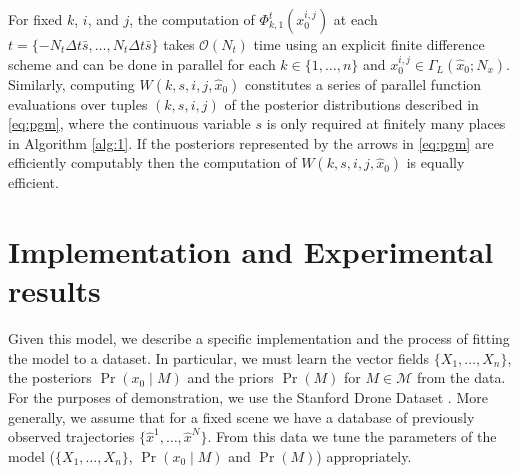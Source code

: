 \documentclass[letterpaper,10pt,conference]{ieeeconf}
\newtheorem{thm}{Theorem}
\begin{document}
For fixed $k$, $i$, and $j$, the computation of $\Phi_{k,1}^t(x_0^{i,j})$ at each $t = \{-N_t \Delta t \bar{s} ,\dots, N_t \Delta t \bar{s}\}$ takes $\mathcal{O}(N_t)$ time using an explicit finite difference scheme and can be done in parallel for each $k \in \{1,\dots, n\}$ and $x_0^{i,j} \in \Gamma_L( \hat{x}_0; N_x)$.
Similarly, computing $W(k,s,i,j,\hat{x}_0)$ constitutes a series of parallel function evaluations over tuples $(k,s,i,j)$ of the posterior distributions described in \eqref{eq:pgm}, where the continuous variable $s$ is only required at finitely many places in Algorithm \ref{alg:1}.
If the posteriors represented by the arrows in \eqref{eq:pgm} are efficiently computably then the computation of $W(k,s,i,j, \hat{x}_0)$ is equally efficient.
  
\section{Implementation and Experimental results} \label{sec:implementation}
  Given this model, we describe a specific implementation and the process of fitting the model to a dataset.
  In particular, we must learn the vector fields $\{X_1, \dots, X_n\}$, the posteriors $\Pr( x_0 \mid M)$ and the priors $\Pr(M)$ for $M \in \mathcal{M}$ from the data.
  For the purposes of demonstration, we use the Stanford Drone Dataset \cite{Robicquet2016}.
  More generally, we assume that for a fixed scene we have a database of previously observed trajectories $\{ \hat{x}^1, \dots, \hat{x}^N\}$.
  From this data we tune the parameters of the model ($\{X_1, \dots, X_n\}$, $\Pr( x_0 \mid M)$ and $\Pr(M)$)  appropriately.
  
\end{document}
